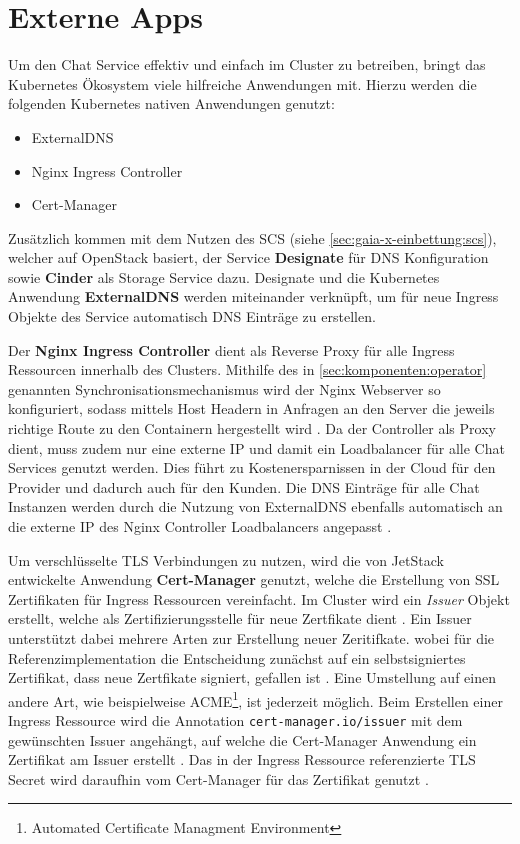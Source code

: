 \section{Externe Apps}
\label{sec:komponenten:externe-apps}

Um den Chat Service effektiv und einfach im Cluster zu betreiben, bringt das Kubernetes Ökosystem viele hilfreiche Anwendungen mit.
Hierzu werden die folgenden Kubernetes nativen Anwendungen genutzt:
\begin{itemize}
  \item ExternalDNS
  \item Nginx Ingress Controller
  \item Cert-Manager
\end{itemize}

Zusätzlich kommen mit dem Nutzen des \acf{SCS} (siehe \ref{sec:gaia-x-einbettung:scs}),
welcher auf OpenStack basiert, der Service \textbf{Designate}
für DNS Konfiguration sowie \textbf{Cinder} als Storage Service dazu. 
Designate und die Kubernetes Anwendung \textbf{ExternalDNS} werden miteinander
verknüpft, um für neue Ingress Objekte des Service automatisch DNS Einträge zu erstellen. 

Der \textbf{Nginx Ingress Controller} dient als Reverse Proxy für alle Ingress Ressourcen innerhalb des Clusters.
Mithilfe des in \ref{sec:komponenten:operator} genannten Synchronisationsmechanismus wird der Nginx Webserver so 
konfiguriert, sodass mittels Host Headern in Anfragen an den Server die jeweils richtige Route zu den Containern hergestellt wird \cite{nginxIngressController}. 
Da der Controller als Proxy dient, muss zudem nur eine externe IP und damit ein Loadbalancer für alle Chat Services genutzt werden.
Dies führt zu Kostenersparnissen in der Cloud für den Provider und dadurch auch für den Kunden.
Die DNS Einträge für alle Chat Instanzen werden durch die Nutzung 
von ExternalDNS ebenfalls automatisch an die externe IP des Nginx Controller Loadbalancers angepasst \cite{externalDNS}.

Um verschlüsselte TLS Verbindungen zu nutzen, wird die von JetStack entwickelte Anwendung \textbf{Cert-Manager} genutzt,
welche die Erstellung von SSL Zertifikaten für Ingress Ressourcen vereinfacht. Im Cluster wird ein \emph{Issuer} Objekt
erstellt, welche als Zertifizierungsstelle für neue Zertfikate dient \cite{CertManager2021}. 
Ein Issuer unterstützt dabei mehrere Arten zur Erstellung neuer Zeritifkate.
wobei für die Referenzimplementation die Entscheidung zunächst auf ein selbstsigniertes Zertifikat, dass neue Zertfikate signiert, gefallen ist \cite{CertManager2021}.
Eine Umstellung auf einen andere Art, wie beispielweise ACME\footnote{Automated Certificate Managment Environment},
ist jederzeit möglich. 
Beim Erstellen einer Ingress Ressource wird die Annotation \texttt{cert-manager.io/issuer} mit dem gewünschten Issuer angehängt,
auf welche die Cert-Manager Anwendung ein Zertifikat am Issuer erstellt \cite{CertManager2021}. 
Das in der Ingress Ressource referenzierte TLS Secret wird daraufhin vom Cert-Manager für das Zertifikat genutzt \cite{CertManager2021}.

